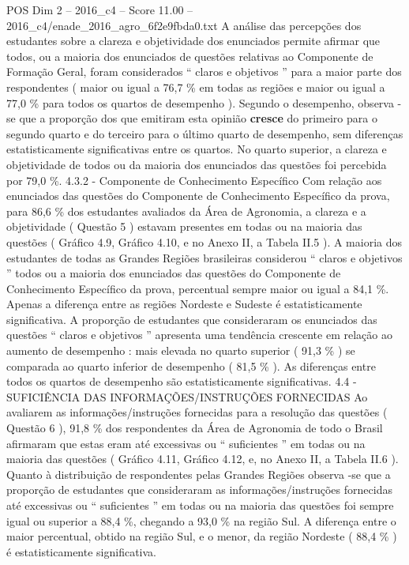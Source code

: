 \begin{textsample}{POS Dim 2 – 2016\_c4 – Score 11.00 – 2016\_c4/enade\_2016\_agro\_6f2e9fbda0.txt}
A análise das percepções dos estudantes sobre a clareza e objetividade dos enunciados permite afirmar que todos, ou a maioria dos enunciados de questões relativas ao Componente de Formação Geral, foram considerados “ claros e objetivos ” para a maior parte dos respondentes ( maior ou igual a 76,7 \% em todas as regiões e maior ou igual a 77,0 \% para todos os quartos de desempenho ).
Segundo o desempenho, observa -se que a proporção dos que emitiram esta opinião \textbf{cresce} do primeiro para o segundo quarto e do terceiro para o último quarto de desempenho, sem diferenças estatisticamente significativas entre os quartos.
No quarto superior, a clareza e objetividade de todos ou da maioria dos enunciados das questões foi percebida por 79,0 \%. 4.3.2 - Componente de Conhecimento Específico Com relação aos enunciados das questões do Componente de Conhecimento Específico da prova, para 86,6 \% dos estudantes avaliados da Área de Agronomia, a clareza e a objetividade ( Questão 5 ) estavam presentes em todas ou na maioria das questões ( Gráfico 4.9, Gráfico 4.10, e no Anexo II, a Tabela II.5 ).
A maioria dos estudantes de todas as Grandes Regiões brasileiras considerou “ claros e objetivos ” todos ou a maioria dos enunciados das questões do Componente de Conhecimento Específico da prova, percentual sempre maior ou igual a 84,1 \%.
Apenas a diferença entre as regiões Nordeste e Sudeste é estatisticamente significativa.
A proporção de estudantes que consideraram os enunciados das questões “ claros e objetivos ” apresenta uma tendência crescente em relação ao aumento de desempenho : mais elevada no quarto superior ( 91,3 \% ) se comparada ao quarto inferior de desempenho ( 81,5 \% ).
As diferenças entre todos os quartos de desempenho são estatisticamente significativas. 4.4 - SUFICIÊNCIA DAS INFORMAÇÕES/INSTRUÇÕES FORNECIDAS Ao avaliarem as informações/instruções fornecidas para a resolução das questões ( Questão 6 ), 91,8 \% dos respondentes da Área de Agronomia de todo o Brasil afirmaram que estas eram até excessivas ou “ suficientes ” em todas ou na maioria das questões ( Gráfico 4.11, Gráfico 4.12, e, no Anexo II, a Tabela II.6 ).
Quanto à distribuição de respondentes pelas Grandes Regiões observa -se que a proporção de estudantes que consideraram as informações/instruções fornecidas até excessivas ou “ suficientes ” em todas ou na maioria das questões foi sempre igual ou superior a 88,4 \%, chegando a 93,0 \% na região Sul.
A diferença entre o maior percentual, obtido na região Sul, e o menor, da região Nordeste ( 88,4 \% ) é estatisticamente significativa.

\end{textsample}
